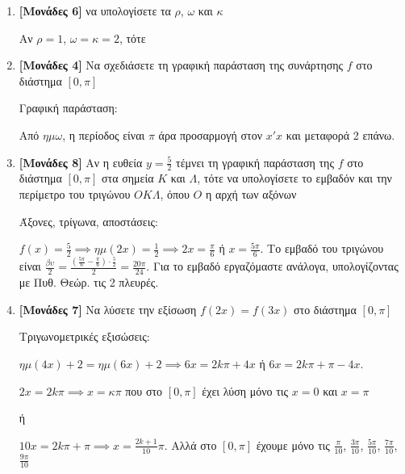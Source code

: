 \documentclass[12pt]{article}
\begin{document}
\begin{enumerate}
 \item \textbf{[Μονάδες 6]} να υπολογίσετε τα $ρ$, $ω$ και $κ$

       Αν $ρ=1$, $ω=κ=2$, τότε

 \item \textbf{[Μονάδες 4]} Να σχεδιάσετε τη γραφική παράσταση της συνάρτησης $f$ στο διάστημα $[0,π]$

       Γραφική παράσταση:

       Από $ημω$, η περίοδος είναι $π$ άρα προσαρμογή στον $x'x$ και μεταφορά 2 επάνω.

 \item \textbf{[Μονάδες 8]} Αν η ευθεία $y=\frac{5}{2}$ τέμνει τη γραφική παράσταση της $f$ στο διάστημα $[0,π]$ στα σημεία $Κ$ και $Λ$, τότε να υπολογίσετε το εμβαδόν και την περίμετρο του τριγώνου $ΟΚΛ$, όπου $Ο$ η αρχή των αξόνων

       Άξονες, τρίγωνα, αποστάσεις:

       $f(x)=\frac{5}{2}\implies ημ(2x)=\frac{1}{2}\implies 2x=\frac{π}{6}$ ή $x=\frac{5π}{6}$. Το εμβαδό του τριγώνου είναι $\frac{βυ}{2}=\frac{(\frac{5π}{6}-\frac{π}{6})\cdot \frac{5}{2}}{2}=\frac{20π}{24}$. Για το εμβαδό εργαζόμαστε ανάλογα, υπολογίζοντας με Πυθ. Θεώρ. τις 2 πλευρές.

 \item \textbf{[Μονάδες 7]} Να λύσετε την εξίσωση $f(2x)=f(3x)$ στο διάστημα $[0,π]$

       Τριγωνομετρικές εξισώσεις:

       $ημ(4x)+2=ημ(6x)+2\implies 6x=2kπ+4x$ ή $6x=2kπ+π-4x$.

       $2x=2kπ\implies x=κπ$ που στο $[0,π]$ έχει λύση μόνο τις $x=0$ και $x=π$

       ή

       $10x=2kπ+π\implies x=\frac{2k+1}{10}π$. Αλλά στο $[0,π]$ έχουμε μόνο τις $\frac{π}{10}$, $\frac{3π}{10}$, $\frac{5π}{10}$, $\frac{7π}{10}$, $\frac{9π}{10}$

\end{enumerate}
\end{document}

